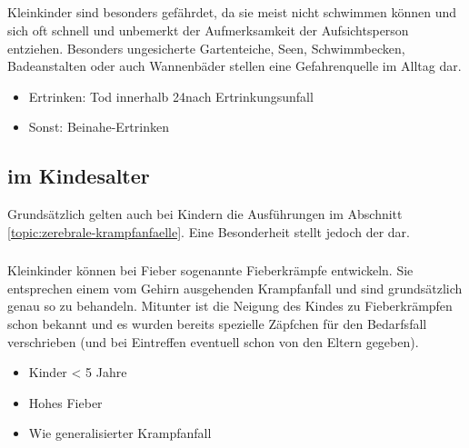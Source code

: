 \subsection{}

\Text
{\TxBeschreibung}
{%
Kleinkinder sind besonders gefährdet, da sie meist nicht
schwimmen können und sich oft schnell und unbemerkt der
Aufmerksamkeit der Aufsichtsperson entziehen. Besonders
ungesicherte Gartenteiche, Seen, Schwimmbecken, Badeanstalten
oder auch Wannenbäder stellen eine Gefahrenquelle im Alltag
dar.}
{
\begin{itemize}
  \item Ertrinken: Tod innerhalb 24\Hour* nach Ertrinkungsunfall
  \item Sonst: Beinahe-Ertrinken
\end{itemize}
}
{}
{}
{}

\begin{Synopsis}
\end{Synopsis}







\subsection{ im Kindesalter}
\label{topic:krampfanfaelle-kinder}

Grundsätzlich gelten auch bei Kindern die Ausführungen im
Abschnitt \ref{topic:zerebrale-krampfanfaelle}. Eine
Besonderheit stellt jedoch der  dar.


\subsubsection{}
\label{topic:fieberkrampf}

\TextSlide{\TxBeschreibung}
{%
Kleinkinder  können bei Fieber sogenannte
Fieberkrämpfe entwickeln. Sie entsprechen einem vom Gehirn
ausgehenden Krampfanfall und sind grundsätzlich genau so zu
behandeln.
Mitunter ist die Neigung des Kindes zu Fieberkrämpfen schon
bekannt und es wurden bereits spezielle Zäpfchen für den
Bedarfsfall verschrieben (und bei Eintreffen eventuell schon
von den Eltern gegeben).
}{
\begin{itemize}
  \item Kinder {\textless} 5 Jahre
  \item Hohes Fieber
  \item Wie generalisierter Krampfanfall
\end{itemize}
}{}{}{}


